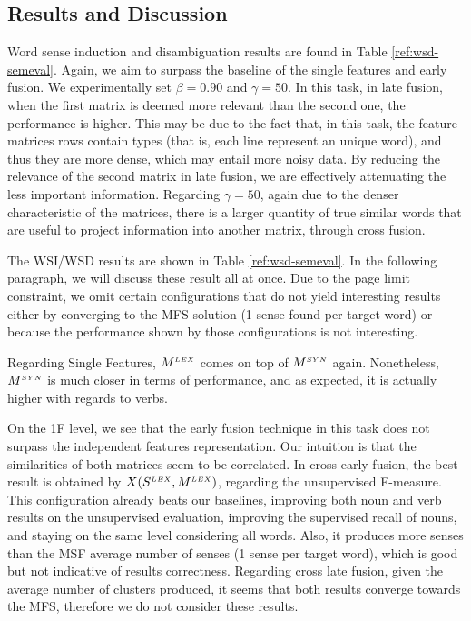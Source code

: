 \subsection{Results and Discussion}
Word sense induction and disambiguation results are found in Table \ref{ref:wsd-semeval}. Again, we aim to surpass the baseline of the single features and early fusion.  We experimentally set $\beta=0.90$ and $\gamma=50$. In this task, in late fusion, when the first matrix  is deemed more relevant than the second one, the performance is higher. This may be due to the fact that, in this task, the feature matrices rows contain types (that is, each line represent an unique word), and thus they are more dense, which may entail more noisy data. By reducing the relevance of the second matrix in late fusion, we are effectively attenuating the less important information. Regarding $\gamma=50$, again due to the denser characteristic of the matrices, there is a larger quantity of true similar words that are useful to project information into another matrix, through cross fusion.  

The WSI/WSD results are shown in Table \ref{ref:wsd-semeval}. In the following paragraph, we will discuss these result all at once. Due to the page limit constraint, we omit certain configurations that do not yield interesting results either by converging to the MFS solution (1 sense found per target word) or because the performance shown by those  configurations is not interesting.

Regarding Single Features, $M^{\scriptscriptstyle LEX}$ comes on top of $M^{\scriptscriptstyle SYN}$ again. Nonetheless, $M^{\scriptscriptstyle SYN}$ is much closer in terms of performance, and as expected, it is actually higher with regards to verbs. 

On the 1F level, we see that the early fusion technique in this task does not surpass the independent features representation. Our intuition is that the similarities of both matrices seem to be correlated. In cross early fusion, the best result is obtained by $X(S^{\scriptscriptstyle LEX}, M^{\scriptscriptstyle LEX})$,  regarding the unsupervised F-measure. This configuration already beats our baselines, improving both noun and verb results on the unsupervised evaluation, improving the supervised recall of nouns, and staying on the same level considering all words. Also, it produces more senses than the MSF average number of senses (1 sense per target word), which is good but not indicative of results correctness. Regarding cross late fusion, given the average number of clusters produced, it seems that both results converge towards the MFS, therefore we do not consider these results.

